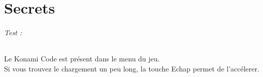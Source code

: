 \documentclass[titlepage, 13px, a4paper]{report}
\begin{document}


\part{Secrets} 
\paragraph*{Test : } \hspace{0pt}
Le Konami Code est présent dans le menu du jeu. \\
Si vous trouvez le chargement un peu long, la touche Echap permet de l'accélerer. \\


\end{document}
